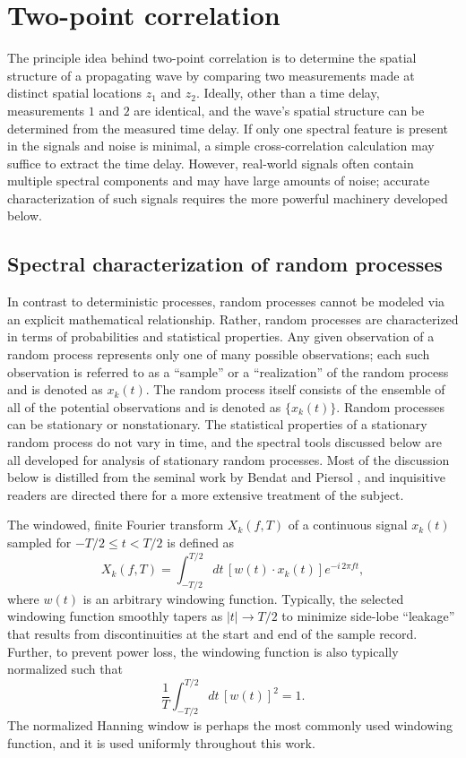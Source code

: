\section{Two-point correlation}
\label{sec:ToroidalCorrelation:two_point_correlation}
The principle idea behind two-point correlation
is to determine the spatial structure of a propagating wave
by comparing two measurements made
at distinct spatial locations $z_1$ and $z_2$.
Ideally, other than a time delay, measurements $1$ and $2$ are identical, and
the wave's spatial structure can be determined from the measured time delay.
If only one spectral feature is present in the signals and noise is minimal,
a simple cross-correlation calculation may suffice to extract the time delay.
However, real-world signals often contain multiple spectral components and
may have large amounts of noise;
accurate characterization of such signals requires the more powerful
machinery developed below.

\subsection{Spectral characterization of random processes}
\label{sec:ToroidalCorrelation:spectral_characterization_of_random_processes}
In contrast to deterministic processes,
random processes cannot be modeled via an explicit mathematical relationship.
Rather, random processes are characterized
in terms of probabilities and statistical properties.
Any given observation of a random process represents
only one of many possible observations;
each such observation is referred to as
a ``sample'' or a ``realization'' of the random process
and is denoted as $x_k(t)$.
The random process itself consists of
the ensemble of all of the potential observations
and is denoted as $\{x_k(t)\}$.
Random processes can be stationary or nonstationary.
The statistical properties of a stationary random process
do not vary in time, and
the spectral tools discussed below
are all developed for analysis of stationary random processes.
Most of the discussion below is distilled from
the seminal work by Bendat and Piersol \cite{bendat_and_piersol}, and
inquisitive readers are directed there
for a more extensive treatment of the subject.

The windowed, finite Fourier transform $X_k(f, T)$
of a continuous signal $x_k(t)$
sampled for $-T / 2 \leq t < T / 2$
is defined as
\begin{equation}
  X_k(f, T)
  =
  \int_{-T / 2}^{T / 2}
  dt \, [w(t) \cdot x_k(t)] e^{-i \, 2 \pi f t},
  \label{eq:ToroidalCorrelation:finite_Fourier_transform}
\end{equation}
where $w(t)$ is an arbitrary windowing function.
Typically, the selected windowing function smoothly tapers
as $|t| \rightarrow T / 2$
to minimize side-lobe ``leakage''
that results from discontinuities at the start and end of the sample record.
Further, to prevent power loss, the windowing function
is also typically normalized such that
\begin{equation}
  \frac{1}{T} \int_{-T/2}^{T/2} dt \, [w(t)]^2 = 1.
\end{equation}
The normalized Hanning window is perhaps
the most commonly used windowing function, and
it is used uniformly throughout this work.

